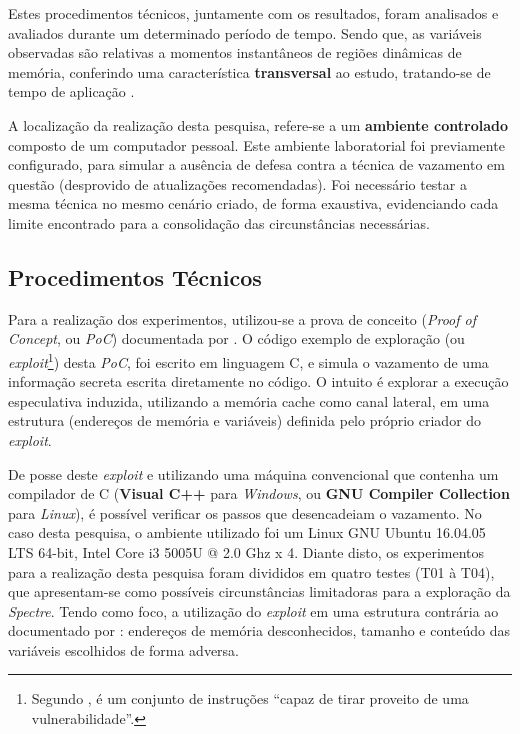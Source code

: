\documentclass[
	article,			    %
	12pt,				    %
	oneside,			    %
	a4paper,			    %
	chapter=TITLE,		    %
	section=TITLE,		    %
	subsection=TITLE,	    %
	english,			    %
	brazil,				    %
	sumario=tradicional
]{abntex2}
\begin{document}
Estes procedimentos técnicos, juntamente com os resultados, foram analisados e avaliados durante um determinado período de tempo. Sendo que, as variáveis observadas são relativas a momentos instantâneos de regiões dinâmicas de memória, conferindo uma característica \textbf{transversal} ao estudo, tratando-se de tempo de aplicação \cite{Mauro2009Metodologia}.

A localização da realização desta pesquisa, refere-se a um \textbf{ambiente controlado} composto de um computador pessoal. Este ambiente laboratorial foi previamente configurado, para simular a ausência de defesa contra a técnica de vazamento em questão (desprovido de atualizações recomendadas). Foi necessário testar a mesma técnica no mesmo cenário criado, de forma exaustiva, evidenciando cada limite encontrado para a consolidação das circunstâncias necessárias.

\subsection{Procedimentos Técnicos}
Para a realização dos experimentos, utilizou-se a prova de conceito (\emph{Proof of Concept}, ou \emph{PoC}) documentada por . O código exemplo de exploração (ou \emph{exploit}\footnote{Segundo  , é um conjunto de instruções ``capaz de tirar proveito de uma vulnerabilidade''.}) desta \emph{PoC}, foi escrito em linguagem C, e simula o vazamento de uma informação secreta escrita diretamente no código. O intuito é explorar a execução especulativa induzida, utilizando a memória cache como canal lateral, em uma estrutura (endereços de memória e variáveis) definida pelo próprio criador do \emph{exploit}. 

De posse deste \emph{exploit} e utilizando uma máquina convencional que contenha um compilador de C (\textbf{Visual C++} para \emph{Windows}, ou \textbf{GNU Compiler Collection} para \emph{Linux}), é possível verificar os passos que desencadeiam o vazamento. No caso desta pesquisa, o ambiente utilizado foi um Linux GNU Ubuntu 16.04.05 LTS 64-bit, Intel\textsuperscript{\tiny\textregistered} Core\textsuperscript{\tiny\texttrademark} i3 5005U @ 2.0 Ghz x 4. Diante disto, os experimentos para a realização desta pesquisa foram divididos em quatro testes (T01 à T04), que apresentam-se como possíveis circunstâncias limitadoras para a exploração da \emph{Spectre}. Tendo como foco, a utilização do \emph{exploit} em uma estrutura contrária ao documentado por : endereços de memória desconhecidos, tamanho e conteúdo das variáveis escolhidos de forma adversa.
\end{document}
